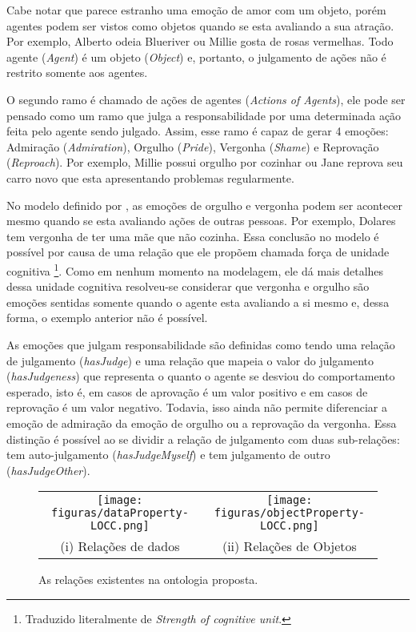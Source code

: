 Cabe notar que parece estranho uma emoção de amor com um objeto, porém agentes
podem ser vistos como objetos quando se esta avaliando a sua atração. Por
exemplo, Alberto odeia Blueriver ou Millie gosta de rosas vermelhas. Todo
agente (\emph{Agent}) é um objeto (\emph{Object}) e, portanto, o julgamento
de ações não é restrito somente aos agentes.

O segundo ramo é chamado de ações de agentes (\emph{Actions of Agents}), ele
pode ser pensado como um ramo que julga a responsabilidade por uma determinada
ação feita pelo agente sendo julgado. Assim, esse ramo é capaz de gerar 4
emoções: Admiração (\emph{Admiration}), Orgulho (\emph{Pride}),
Vergonha (\emph{Shame}) e Reprovação (\emph{Reproach}). Por exemplo, Millie
possui orgulho por cozinhar ou Jane reprova seu carro novo que esta
apresentando problemas regularmente.

No modelo definido por \citet{ortony1988cse}, as emoções de orgulho e vergonha
podem ser acontecer mesmo quando se esta avaliando ações de outras pessoas.
Por exemplo, Dolares tem vergonha de ter uma mãe que não cozinha. Essa
conclusão no modelo é possível por causa de uma relação que ele propõem
chamada força de unidade cognitiva \footnote{Traduzido literalmente de
\emph{Strength of cognitive unit}.}. Como em nenhum momento na modelagem, ele
dá mais detalhes dessa unidade cognitiva resolveu-se considerar que vergonha e
orgulho são emoções sentidas somente quando o agente esta avaliando a si
mesmo e, dessa forma, o exemplo anterior não é possível.

As emoções que julgam responsabilidade são definidas como tendo uma relação de
julgamento (\emph{hasJudge}) e uma relação que mapeia o valor do julgamento
(\emph{hasJudgeness}) que representa o quanto o agente se desviou do
comportamento esperado, isto é, em casos de aprovação é um valor positivo e em
casos de reprovação é um valor negativo. Todavia, isso ainda não permite
diferenciar a emoção de admiração da emoção de orgulho ou a reprovação da
vergonha. Essa distinção é possível ao se dividir a relação de julgamento com
duas sub-relações: tem auto-julgamento (\emph{hasJudgeMyself}) e tem
julgamento de outro (\emph{hasJudgeOther}).

\begin{figure}
  \centering
  \begin{tabular}{cc}
  \texttt{[image: figuras/dataProperty-LOCC.png]} & \texttt{[image: figuras/objectProperty-LOCC.png]} \\
  (i) Relações de dados & (ii) Relações de Objetos
  \end{tabular}
  \caption{As relações existentes na ontologia proposta.}
  \label{fig:kplocc}
\end{figure}

